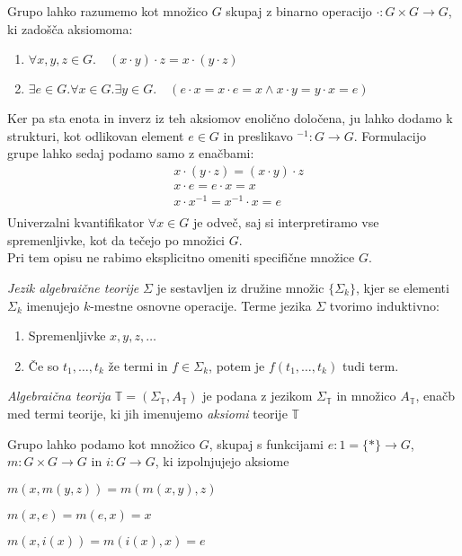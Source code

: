 
\begin{primer}
Grupo lahko razumemo kot množico $G$ skupaj z binarno operacijo $\cdot : G \times G \to G$, ki zadošča aksiomoma:
%
\begin{enumerate}
\item $\forall x,y,z \in G . \quad (x\cdot y) \cdot z = x \cdot (y \cdot z)$
\item $\exists e \in G . \forall x \in G . \exists y \in G . \quad (e \cdot x = x \cdot e = x \wedge x \cdot y = y \cdot x = e)$
\end{enumerate}
\end{primer}
Ker pa sta enota in inverz iz teh aksiomov enolično določena, ju lahko dodamo k strukturi, kot odlikovan element $e \in G$ in preslikavo $^{-1} : G \to G$.
%
Formulacijo grupe lahko sedaj podamo samo z enačbami:
\vspace{1em}
\begin{align*}
&x \cdot (y \cdot z) = (x \cdot y) \cdot z \\
&x \cdot e = e \cdot x = x \\
&x \cdot x^{-1} = x^{-1} \cdot x = e \\
\end{align*}
Univerzalni kvantifikator $\forall x \in G$ je odveč, saj si interpretiramo vse spremenljivke, kot da tečejo po množici $G$. \\
Pri tem opisu ne rabimo eksplicitno omeniti specifične množice $G$.
%
\begin{definicija}
\emph{Jezik algebraične teorije} $\Sigma$ je sestavljen iz družine množic $\lbrace \Sigma_k \rbrace$, kjer se elementi $\Sigma_k$ imenujejo $k$-mestne osnovne operacije. Terme jezika $\Sigma$ tvorimo induktivno:
\begin{enumerate}
\item Spremenljivke $x,y,z, \ldots$
\item Če so $t_1, \ldots, t_k$ že termi in $f \in \Sigma_k$, potem je $f(t_1,\ldots, t_k)$ tudi term.
\end{enumerate}
\end{definicija}
%
\begin{definicija}
\emph{Algebraična teorija} $\mathbb{T} = (\Sigma_\mathbb{T}, A_\mathbb{T})$ je podana z jezikom $\Sigma_\mathbb{T}$ in množico $A_\mathbb{T}$, enačb med termi teorije, ki jih imenujemo \emph{aksiomi} teorije $\mathbb{T}$
\end{definicija}
%
\begin{primer}
Grupo lahko podamo kot množico $G$, skupaj s funkcijami $e : 1 = \lbrace * \rbrace \to G$, $m : G \times G \to G$ in $i : G \to G$, ki izpolnjujejo aksiome
\begin{description}
\item $m(x,m(y,z)) = m(m(x,y),z)$
\item $m(x,e) = m(e,x) = x$
\item $m(x,i(x)) = m(i(x),x) = e$
\end{description}
\end{primer}
